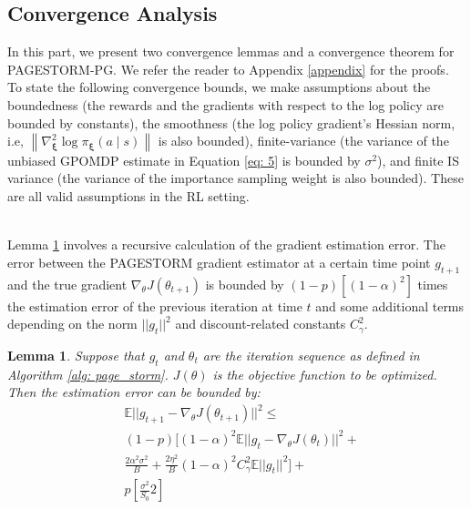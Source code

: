 \documentclass[10pt,twocolumn,letterpaper]{article}
\newtheorem{lemma}[theorem]{Lemma}
\begin{document}
\subsection{Convergence Analysis}

In this part, we present two convergence lemmas and a convergence theorem for PAGESTORM-PG. We refer the reader to Appendix \ref{appendix} for the proofs. To state the following convergence bounds, we make assumptions about the boundedness (the rewards and the gradients with respect to the log policy are bounded by constants), the smoothness (the log policy gradient's Hessian norm, i.e, $\left\|\nabla_{\boldsymbol{\xi}}^{2} \log \pi_{\boldsymbol{\xi}}(a \mid s)\right\|$ is also bounded), finite-variance (the variance of the unbiased GPOMDP estimate in Equation \ref{eq: 5} is bounded by $\sigma^{2}$), and finite IS variance (the variance of the importance sampling weight is also bounded). These are all valid assumptions in the RL setting. 

\\


Lemma \ref{lm:convergence} involves a recursive calculation of the gradient estimation error. The error between the PAGESTORM gradient estimator at a certain time point $g_{t+1}$ and the true gradient $\nabla_\theta J(\theta_{t+1})$ is bounded by $(1-p)\left[(1-\alpha)^2\right]$ times the estimation error of the previous iteration at time $t$ and some additional terms depending on the norm $||g_{t}||^2$ and discount-related constants $C_\gamma^2$.

\begin{lemma} \label{lm:convergence}
Suppose that $g_t$ and $\theta_t$ are the iteration sequence as defined in Algorithm \ref{alg: page_storm}. $J(\theta)$ is the objective function to be optimized. Then the estimation error can be bounded by:
\begin{equation}
\begin{split}
& \mathbb{E}||g_{t+1}-\nabla_\theta J(\theta_{t+1})||^2 \leq \\ 
& (1-p)[(1-\alpha)^2 \mathbb{E}||g_{t}-\nabla_\theta J(\theta_{t})||^2 + \\
& \frac{2\alpha^2\sigma^2}{B} + \frac{2 \eta^2}{B}(1-\alpha)^2 C_\gamma^2 \mathbb{E} ||g_{t}||^2 ] + \\ 
& p\left[\frac{\sigma^2}{S_0}2\right]
\end{split}
\end{equation}
\end{lemma}
\end{document}
